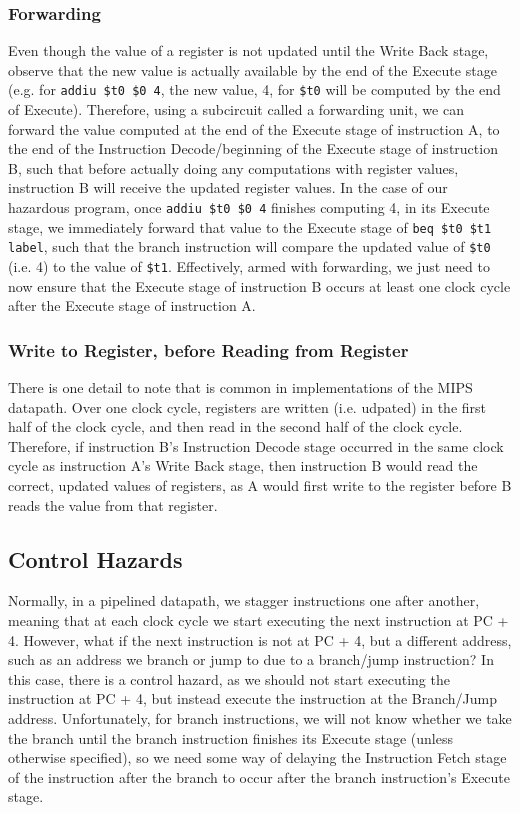 \documentclass{article}
\begin{document}
 \subsubsection{Forwarding}
 Even though the value of a register is not updated until the Write Back stage, observe that the new value is actually available by the end of the Execute stage (e.g. for \texttt{addiu \$t0 \$0 4}, the new value, 4, for \texttt{\$t0} will be computed by the end of Execute). Therefore, using a subcircuit called a forwarding unit, we can forward the value computed at the end of the Execute stage of instruction A, to the end of the Instruction Decode/beginning of the Execute stage of instruction B, such that before actually doing any computations with register values, instruction B will receive the updated register values. In the case of our hazardous program, once \texttt{addiu \$t0 \$0 4} finishes computing 4, in its Execute stage, we immediately forward that value to the Execute stage of \texttt{beq \$t0 \$t1 label}, such that the branch instruction will compare the updated value of \texttt{\$t0} (i.e. 4) to the value of \texttt{\$t1}. Effectively, armed with forwarding, we just need to now ensure that the Execute stage of instruction B occurs at least one clock cycle after the Execute stage of instruction A. %
 
 \subsubsection{Write to Register, before Reading from Register}
 There is one detail to note that is common in implementations of the MIPS datapath. Over one clock cycle, registers are written (i.e. udpated) in the first half of the clock cycle, and then read in the second half of the clock cycle. Therefore, if instruction B's Instruction Decode stage occurred in the same clock cycle as instruction A's Write Back stage, then instruction B would read the correct, updated values of registers, as A would first write to the register before B reads the value from that register.
 
 \subsection{Control Hazards}
Normally, in a pipelined datapath, we stagger instructions one after another, meaning that at each clock cycle we start executing the next instruction at PC + 4. However, what if the next instruction is not at PC + 4, but a different address, such as an address we branch or jump to due to a branch/jump instruction? In this case, there is a control hazard, as we should not start executing the instruction at PC + 4, but instead execute the instruction at the Branch/Jump address. Unfortunately, for branch instructions, we will not know whether we take the branch until the branch instruction finishes its Execute stage (unless otherwise specified), so we need some way of delaying the Instruction Fetch stage of the instruction after the branch to occur after the branch instruction's Execute stage. 
\end{document}
